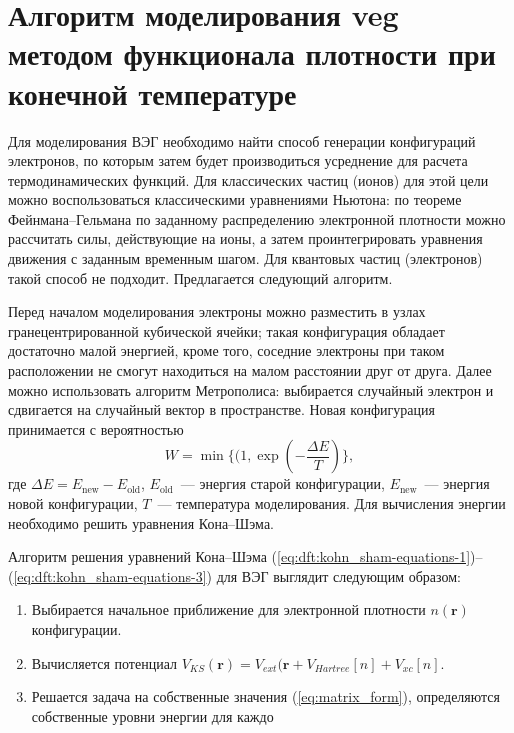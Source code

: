 \section{Алгоритм моделирования \texorpdfstring{\acrshort{veg}}{ВЭГ} методом функционала плотности при конечной температуре}

Для моделирования ВЭГ необходимо найти способ генерации конфигураций электронов, по которым затем будет производиться усреднение для расчета термодинамических функций. Для классических частиц (ионов) для этой цели можно воспользоваться классическими уравнениями Ньютона: по теореме Фейнмана--Гельмана по заданному распределению электронной плотности можно рассчитать силы, действующие на ионы, а затем проинтегрировать уравнения движения с заданным временным шагом. Для квантовых частиц (электронов) такой способ не подходит. Предлагается следующий алгоритм.

Перед началом моделирования электроны можно разместить в узлах гранецентрированной кубической ячейки; такая конфигурация обладает достаточно малой энергией, кроме того, соседние электроны при таком расположении не смогут находиться на малом расстоянии друг от друга. Далее можно использовать алгоритм Метрополиса: выбирается случайный электрон и сдвигается на случайный вектор в пространстве. Новая конфигурация принимается с вероятностью
%
\begin{equation}
    W = \min\{(1, \exp(-\frac{\Delta E}{T}) \},
\end{equation}
%
где $\Delta E = E_\text{new} - E_\text{old}$, $E_\text{old}$~--- энергия старой конфигурации, $E_\text{new}$~--- энергия новой конфигурации, $T$~--- температура моделирования. Для вычисления энергии необходимо решить уравнения Кона--Шэма.

Алгоритм решения уравнений Кона--Шэма (\ref{eq:dft:kohn_sham-equations-1})--(\ref{eq:dft:kohn_sham-equations-3}) для ВЭГ выглядит следующим образом:

\begin{enumerate}
    \item Выбирается начальное приближение для электронной плотности $n(\mathbf{r})$ конфигурации.
    \item Вычисляется потенциал $V_{KS}(\mathbf{r}) = V_{ext}(\mathbf{r} + V_{Hartree}[n] + V_{xc}[n]$.
    \item Решается задача на собственные значения (\ref{eq:matrix_form}), определяются собственные уровни энергии для каждо
\end{enumerate}